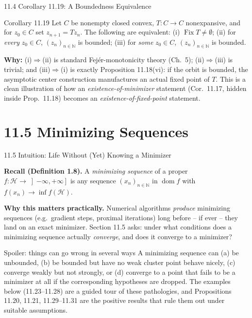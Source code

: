 \documentclass[aspectratio=169,10pt]{beamer}
\newcommand{\mHH}{\mathcal H}
\newcommand{\dom}{\operatorname{dom}}
\begin{document}
\begin{frame}{11.4 Corollary 11.19: A Boundedness Equivalence}

  \begin{block}{Corollary 11.19}
    Let $C$ be nonempty closed convex, $T:C\to C$ nonexpansive, and
    for $z_0\in C$ set $z_{n+1}=Tz_n$. The following are equivalent:
    (i) $\operatorname{Fix}T\neq\emptyset$; (ii) for \emph{every}
    $z_0\in C$, $(z_n)_{n\in\mathbb N}$ is bounded; (iii) for
    \emph{some} $z_0\in C$, $(z_n)_{n\in\mathbb N}$ is bounded.
  \end{block}

  \textbf{Why:} (i)$\Rightarrow$(ii) is standard Fej\'er-monotonicity
  theory (Ch.\ 5); (ii)$\Rightarrow$(iii) is trivial; and
  (iii)$\Rightarrow$(i) is exactly Proposition 11.18(vi): if the
  orbit is bounded, the asymptotic center construction manufactures
  an actual fixed point of $T$. This is a clean illustration of how
  an \emph{existence-of-minimizer} statement (Cor.\ 11.17, hidden
  inside Prop.\ 11.18) becomes an \emph{existence-of-fixed-point}
  statement.

\end{frame}

\section{11.5 Minimizing Sequences}

\begin{frame}{11.5 Intuition: Life Without (Yet) Knowing a Minimizer}

  \textbf{Recall (Definition 1.8).} A \emph{minimizing sequence} of a
  proper $f:\mHH\to\left]-\infty,+\infty\right]$ is any sequence
  $(x_n)_{n\in\mathbb N}$ in $\dom f$ with $f(x_n)\to\inf f(\mHH)$.

  \textbf{Why this matters practically.} Numerical algorithms
  \emph{produce} minimizing sequences (e.g.\ gradient steps,
  proximal iterations) long before -- if ever -- they land on an
  exact minimizer. Section 11.5 asks: under what conditions does a
  minimizing sequence actually \emph{converge}, and does it converge
  to a minimizer?

  \begin{alertblock}{Spoiler: things can go wrong in several ways}
    A minimizing sequence can (a) be unbounded, (b) be bounded but
    have no weak cluster point behave nicely, (c) converge weakly but
    not strongly, or (d) converge to a point that fails to be a
    minimizer at all if the corresponding hypotheses are dropped. The
    examples below (11.23--11.28) are a guided tour of these
    pathologies, and Propositions 11.20, 11.21, 11.29--11.31 are the
    positive results that rule them out under suitable assumptions.
  \end{alertblock}

\end{frame}
\end{document}
